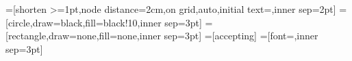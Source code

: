 \def\caixa#1{\medskip
  \begin{center}
  \fbox{\begin{minipage}{0.9\textwidth}\protect{#1}\end{minipage}}
  \end{center}}

\newcommand{\mybox}[2][4mm]{
  \tikz{\node[fill=barcolor!40,align=center,inner sep=#1]{#2};}}
\newcommand{\mycbox}[2][4mm]{
  \begin{center}\mybox[#1]{#2}\end{center}}



\usetikzlibrary{%
  positioning
 ,patterns
 ,arrows
 ,arrows.meta
 ,automata
 ,calc
 ,shapes
 ,fit
 ,tikzmark
 ,fadings
 ,decorations.pathreplacing
 ,plotmarks
 ,decorations.markings
 ,shadows
}
=[shorten >=1pt,node distance=2cm,on grid,auto,initial text={},inner sep=2pt]
=[circle,draw=black,fill=black!10,inner sep=3pt]
=[rectangle,draw=none,fill=none,inner sep=3pt]
=[accepting]
=[font=\footnotesize,inner sep=3pt]

\def\uppaal{\textsc{Uppaal}}
\def\cc#1{\mathcal{C}(#1)}
\newcommand{\impp}{\mathbin{\rightarrow}}
\newcommand{\dimpp}{\mathbin{\leftrightarrow}}
\newcommand{\always}{\boxempty}
\newcommand{\nexts}{\bigcirc}
\newcommand{\until}{\mathbin{\mathcal U}}
\newcommand{\eventual}{\Diamond}
\newcommand{\true}{\mathsf{true}}
\newcommand{\false}{\mathsf{false}}
\newcommand{\fdec}[3]{#1: #2 \longrightarrow  #3}
\newcommand{\pow}[1]{{\cal P}#1}
\newcommand{\tran}[1]{\stackrel{#1}{\longrightarrow}}
\newcommand{\PP}{\alert{P}}
\newcommand{\universal}[2]{\forall_{#1}\; .\; #2}
\newcommand{\existential}[2]{\exists_{#1}\; .\; #2}
\newcommand{\enset}[1]{\mathopen{ \{ }#1\mathclose{ \} }} %
\newcommand{\diam}[1]{\ensuremath{\langle #1 \rangle}}
\newcommand{\boxx}[1]{\ensuremath{[#1]}}
\newcommand{\evm}[1]{\langle #1 \rangle\,}
\newcommand{\alm}[1]{[#1]\,}
\newcommand{\evmb}[1]{\evm{\alert{#1}}}
\newcommand{\almb}[1]{\alm{\alert{#1}}}
\def\R{\mathcal{R}}
\def\TL#1{\mathcal{T}(#1)}

